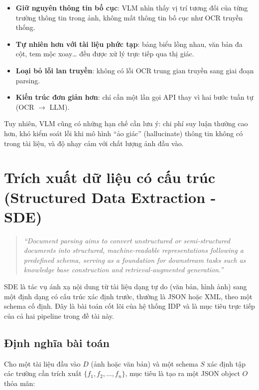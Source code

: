 ﻿\documentclass[12pt]{report}
\begin{document}
\begin{itemize}
    \item \textbf{Giữ nguyên thông tin bố cục}: VLM nhìn thấy vị trí tương đối của từng trường thông tin trong ảnh, không mất thông tin bố cục như OCR truyền thống.
    \item \textbf{Tự nhiên hơn với tài liệu phức tạp}: bảng biểu lồng nhau, văn bản đa cột, tem mộc xoay\ldots{} đều được xử lý trực tiếp qua thị giác.
    \item \textbf{Loại bỏ lỗi lan truyền}: không có lỗi OCR trung gian truyền sang giai đoạn parsing.
    \item \textbf{Kiến trúc đơn giản hơn}: chỉ cần một lần gọi API thay vì hai bước tuần tự (OCR $\rightarrow$ LLM).
\end{itemize}

Tuy nhiên, VLM cũng có những hạn chế cần lưu ý: chi phí suy luận thường cao hơn, khó kiểm soát lỗi khi mô hình ``ảo giác'' (hallucinate) thông tin không có trong tài liệu, và độ nhạy cảm với chất lượng ảnh đầu vào.

\section{Trích xuất dữ liệu có cấu trúc (Structured Data Extraction - SDE)}\label{sec:structured_extraction}

\begin{quote}
\emph{``Document parsing aims to convert unstructured or semi-structured documents into structured, machine-readable representations following a predefined schema, serving as a foundation for downstream tasks such as knowledge base construction and retrieval-augmented generation.''} \cite{docparsing2024}
\end{quote}

SDE là tác vụ ánh xạ nội dung từ tài liệu dạng tự do (văn bản, hình ảnh) sang một định dạng có cấu trúc xác định trước, thường là JSON hoặc XML, theo một schema cố định. Đây là bài toán cốt lõi của hệ thống IDP và là mục tiêu trực tiếp của cả hai pipeline trong đề tài này.

\subsection{Định nghĩa bài toán}\label{sec:sde_definition}

Cho một tài liệu đầu vào $D$ (ảnh hoặc văn bản) và một schema $S$ xác định tập các trường cần trích xuất $\{f_1, f_2, \ldots, f_n\}$, mục tiêu là tạo ra một JSON object $O$ thỏa mãn:
\end{document}
